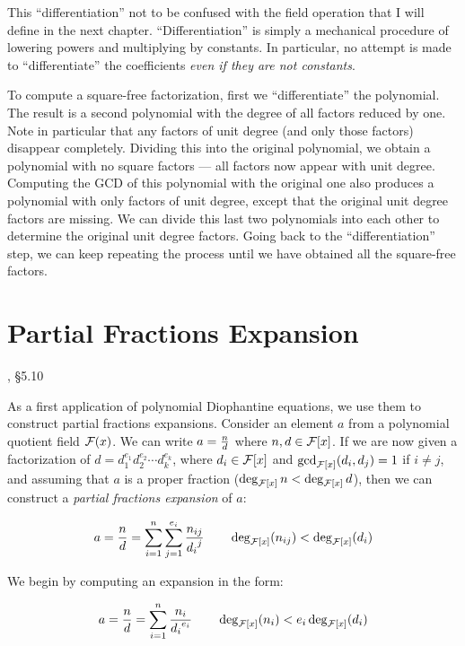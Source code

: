 This ``differentiation'' not to be confused with the field operation
that I will define in the next chapter.  ``Differentiation'' is simply
a mechanical procedure of lowering powers and multiplying by
constants.  In particular, no attempt is made to ``differentiate''
the coefficients {\it even if they are not constants}.

To compute a square-free factorization, first we ``differentiate'' the
polynomial.  The result is a second polynomial with the degree of all
factors reduced by one.  Note in particular that any factors of unit
degree (and only those factors) disappear completely.  Dividing this
into the original polynomial, we obtain a polynomial with no square
factors --- all factors now appear with unit degree.  Computing the
GCD of this polynomial with the original one also produces a
polynomial with only factors of unit degree, except that the original
unit degree factors are missing.  We can divide this last two
polynomials into each other to determine the original unit degree
factors.  Going back to the ``differentiation'' step, we can keep
repeating the process until we have obtained all the square-free
factors.

\vfill\eject

\section{Partial Fractions Expansion}
, \S5.10

As a first application of polynomial Diophantine equations, we use
them to construct partial fractions expansions.  Consider an element
$a$ from a polynomial quotient field ${\cal F}(x)$.  We can write
$a={n\over d}$ where $n,d\in{\cal F}[x]$.  If we are now given a
factorization of $d=d_1^{e_1} d_2^{e_2} \cdots d_k^{e_k}$, where
$d_i\in {\cal F}[x]$ and $\gcd_{{\cal F}[x]}(d_i,d_j)=1$ if $i\ne j$,
and assuming that $a$ is a proper fraction
($\deg_{{\cal F}[x]}n < \deg_{{\cal F}[x]}d$),
then we can construct a {\it partial fractions expansion} of $a$:

\begin{displaymath}
a={n\over d}=\sum_{i=1}^{n}\sum_{j=1}^{e_i} {n_{ij}\over {d_i}^j}
\qquad \deg_{{\cal F}[x]}(n_{ij}) < \deg_{{\cal F}[x]}(d_i)
\end{displaymath}

We begin by computing an expansion in the form:

\begin{displaymath}
a={n\over d}=\sum_{i=1}^{n} {n_i\over {d_i}^{e_i}}
\qquad \deg_{{\cal F}[x]}(n_i) < e_i\deg_{{\cal F}[x]}(d_i)
\end{displaymath}

